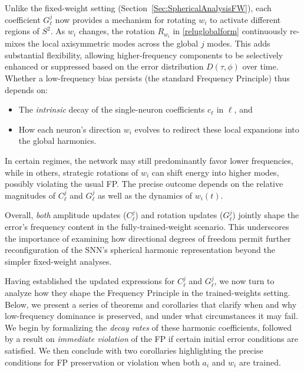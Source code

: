 \documentclass[review,onefignum,onetabnum,onealgnum]{siamart250106}
\numberwithin{theorem}{section}
\begin{document}
 
Unlike the fixed-weight setting (Section~\ref{Sec:SphericalAnalysisFW}), each coefficient $G_{\ell}^j$ now provides 
a mechanism for rotating $w_i$ to activate different regions of $S^2$.  As $w_i$ changes, the rotation $R_{w_i}$ in 
\eqref{reluglobalform} continuously re-mixes the local axisymmetric modes across the global $j$ modes.  This adds 
substantial flexibility, allowing higher-frequency components to be selectively enhanced or suppressed based on the 
error distribution $D(\tau,\phi)$ over time.  Whether a low-frequency bias persists (the standard Frequency Principle) 
thus depends on:
\begin{itemize}
    \item The \emph{intrinsic} decay of the single-neuron coefficients $c_{\ell}$ in $\ell$, and
    \item How each neuron’s direction $w_i$ evolves to redirect these local expansions into the global harmonics.
\end{itemize}
In certain regimes, the network may still predominantly favor lower frequencies, while in others, strategic rotations 
of $w_i$ can shift energy into higher modes, possibly violating the usual FP.  The precise outcome depends on the 
relative magnitudes of $C_{\ell}^j$ and $G_{\ell}^j$ as well as the dynamics of $w_i(t)$.  

Overall, \emph{both} amplitude updates ($C_{\ell}^j$) and rotation updates ($G_{\ell}^j$) jointly shape the error’s 
frequency content in the fully-trained-weight scenario.  This underscores the importance of examining how directional 
degrees of freedom permit further reconfiguration of the SNN’s spherical harmonic representation beyond the simpler 
fixed-weight analyses.





Having established the updated expressions for \(C_{\ell}^j\) and \(G_{\ell}^j\), we now turn to analyze how they shape the Frequency Principle in the trained-weights setting.  Below, we present a series of theorems and corollaries that clarify when and why low-frequency dominance is preserved, and under what circumstances it may fail.  We begin by formalizing the \emph{decay rates} of these harmonic coefficients, followed by a result on \emph{immediate violation} of the FP if certain initial error conditions are satisfied.  We then conclude with two corollaries highlighting the precise conditions for FP preservation or violation when both \(a_i\) and \(w_i\) are trained.
\end{document}
